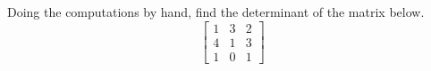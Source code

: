 Doing the computations by hand, find the determinant of the matrix below.
%
\begin{equation*}
\begin{bmatrix}
 1 & 3 & 2 \\
 4 & 1 & 3 \\
 1 & 0 & 1
\end{bmatrix}
\end{equation*}